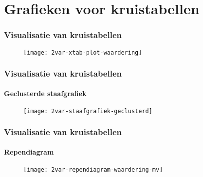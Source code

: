 \documentclass[aspectratio=169]{beamer}
\begin{document}
\section{Grafieken voor kruistabellen}

\begin{frame}
  \frametitle{Visualisatie van kruistabellen}
  
  \begin{figure}
    \centering
    \texttt{[image: 2var-xtab-plot-waardering]}
  \end{figure}
  
\end{frame}

\begin{frame}
  \frametitle{Visualisatie van kruistabellen}
  \framesubtitle{Geclusterde staafgrafiek}
  
  \begin{figure}
    \centering
    \texttt{[image: 2var-staafgrafiek-geclusterd]}
  \end{figure}
  
\end{frame}

\begin{frame}
  \frametitle{Visualisatie van kruistabellen}
  \framesubtitle{Rependiagram}
  
  \begin{figure}
    \centering
    \texttt{[image: 2var-rependiagram-waardering-mv]}
  \end{figure}
  
\end{frame}
\end{document}
